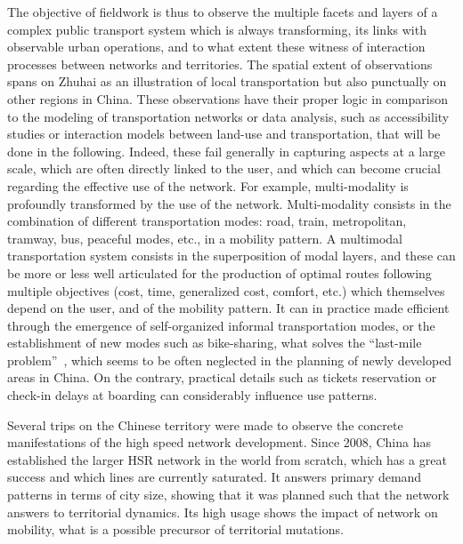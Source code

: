 The objective of fieldwork is thus to observe the multiple facets and layers of a complex public transport system which is always transforming, its links with observable urban operations, and to what extent these witness of interaction processes between networks and territories. The spatial extent of observations spans on Zhuhai as an illustration of local transportation but also punctually on other regions in China. These observations have their proper logic in comparison to the modeling of transportation networks or data analysis, such as accessibility studies or interaction models between land-use and transportation, that will be done in the following. Indeed, these fail generally in capturing aspects at a large scale, which are often directly linked to the user, and which can become crucial regarding the effective use of the network. For example, multi-modality is profoundly transformed by the use of the network. Multi-modality consists in the combination of different transportation modes: road, train, metropolitan, tramway, bus, peaceful modes, etc., in a mobility pattern. A multimodal transportation system consists in the superposition of modal layers, and these can be more or less well articulated for the production of optimal routes following multiple objectives (cost, time, generalized cost, comfort, etc.) which themselves depend on the user, and of the mobility pattern. It can in practice made efficient through the emergence of self-organized informal transportation modes, or the establishment of new modes such as bike-sharing, what solves the ``last-mile problem''~\citep{liu2012solving}, which seems to be often neglected in the planning of newly developed areas in China. On the contrary, practical details such as tickets reservation or check-in delays at boarding can considerably influence use patterns.


Several trips on the Chinese territory were made to observe the concrete manifestations of the high speed network development. Since 2008, China has established the larger HSR network in the world from scratch, which has a great success and which lines are currently saturated. It answers primary demand patterns in terms of city size, showing that it was planned such that the network answers to territorial dynamics. Its high usage shows the impact of network on mobility, what is a possible precursor of territorial mutations.

